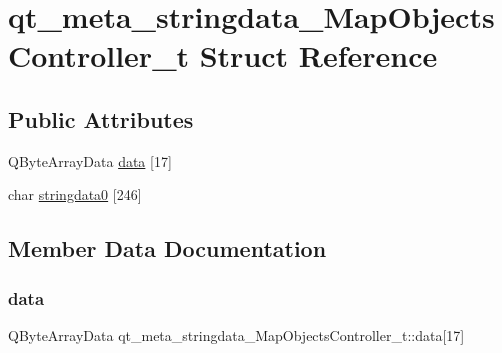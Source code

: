 \hypertarget{structqt__meta__stringdata___map_objects_controller__t}{}\section{qt\+\_\+meta\+\_\+stringdata\+\_\+\+Map\+Objects\+Controller\+\_\+t Struct Reference}
\label{structqt__meta__stringdata___map_objects_controller__t}
\subsection*{Public Attributes}
\begin{DoxyCompactItemize}
\item 
Q\+Byte\+Array\+Data \mbox{\hyperlink{structqt__meta__stringdata___map_objects_controller__t_ac2b8531f626b5e2455ba91588d65b617}{data}} \mbox{[}17\mbox{]}
\item 
char \mbox{\hyperlink{structqt__meta__stringdata___map_objects_controller__t_afb10a63400c750d7edf5393cbc860814}{stringdata0}} \mbox{[}246\mbox{]}
\end{DoxyCompactItemize}


\subsection{Member Data Documentation}
\mbox{\label{structqt__meta__stringdata___map_objects_controller__t_ac2b8531f626b5e2455ba91588d65b617}} 
\subsubsection{\texorpdfstring{data}{data}}
{\footnotesize\ttfamily Q\+Byte\+Array\+Data qt\+\_\+meta\+\_\+stringdata\+\_\+\+Map\+Objects\+Controller\+\_\+t\+::data\mbox{[}17\mbox{]}}

\mbox{\label{structqt__meta__stringdata___map_objects_controller__t_afb10a63400c750d7edf5393cbc860814}} 
